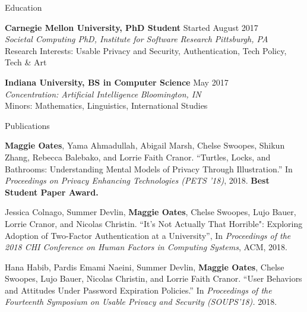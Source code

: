 \documentclass{resume} %
\begin{document}

\begin{rSection}{Education}

{\bf Carnegie Mellon University, PhD Student} \hfill Started August 2017 \\ 
\textit{Societal Computing PhD, Institute for Software Research} \hfill {\em Pittsburgh, PA}\\
Research Interests: Usable Privacy and Security, Authentication, Tech Policy, Tech \& Art

{\bf Indiana University, BS in Computer Science} \hfill May 2017 \\ 
\textit{Concentration: Artificial Intelligence} \hfill {\em Bloomington, IN}\\
Minors: Mathematics, Linguistics, International Studies

\end{rSection}

\begin{rSection}{Publications}
\item \textbf{Maggie Oates}, Yama Ahmadullah, Abigail Marsh, Chelse Swoopes, Shikun Zhang, Rebecca Balebako, and Lorrie Faith Cranor. ``Turtles, Locks, and Bathrooms: Understanding Mental Models of Privacy Through Illustration.''
	In \textit{Proceedings on Privacy Enhancing Technologies (PETS '18)}, 2018. \textbf{Best Student Paper Award.}
	\item Jessica Colnago, Summer Devlin, \textbf{Maggie Oates}, Chelse Swoopes, Lujo Bauer, Lorrie Cranor, and Nicolas Christin. 
		``It's Not Actually That Horrible": Exploring Adoption of Two-Factor Authentication at a University'', In \textit{Proceedings of the 2018 CHI Conference on Human Factors in Computing Systems}, ACM, 2018.
	\item Hana Habib, Pardis Emami Naeini, Summer Devlin, \textbf{Maggie Oates}, Chelse Swoopes, Lujo Bauer, Nicolas Christin, and Lorrie Faith Cranor. ``User Behaviors and Attitudes Under Password Expiration Policies.''
		In \textit{Proceedings of the Fourteenth Symposium on Usable Privacy and Security (SOUPS'18).} 2018.
\end{rSection}
\end{document}
